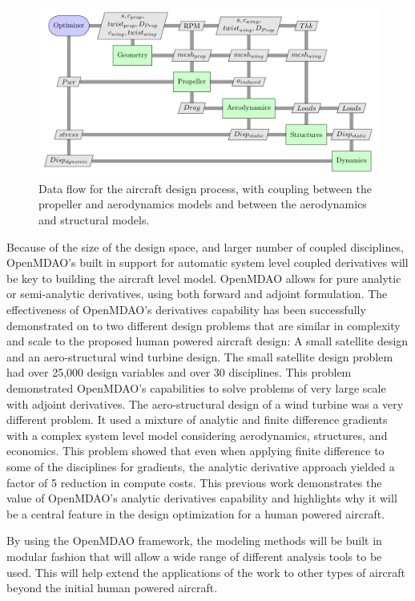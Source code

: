 \documentclass[]{aiaa-tc}
\begin{document}
    \begin{figure} \centering
        \includegraphics[width=.75\textwidth]{xdsm/overall}
        \caption{Data flow for the aircraft design process, with coupling between the propeller and aerodynamics models 
        and between the aerodynamics and structural models. }
        \label{fig:n2}
    \end{figure}

    Because of the size of the design space, and larger number of coupled disciplines, OpenMDAO's built in support for 
    automatic system level coupled derivatives will be key to building the aircraft level model. OpenMDAO allows for 
    pure analytic or semi-analytic derivatives, using both forward and adjoint formulation. The effectiveness of OpenMDAO's 
    derivatives capability has been successfully demonstrated on to two different design problems that are similar in complexity 
    and scale to the proposed human powered aircraft design: A small satellite design and an aero-structural 
    wind turbine design\cite{gray2014derivatives}. The small satellite design problem had over 25,000 design variables 
    and over 30 disciplines. This problem demonstrated OpenMDAO's capabilities to solve problems of very large scale with adjoint 
    derivatives. The aero-structural design of a wind turbine was a very different problem. It used a mixture of analytic and 
    finite difference gradients with a complex system level model considering aerodynamics, structures, and economics. 
    This problem showed that even when applying finite difference to some of the disciplines for gradients, the analytic 
    derivative approach yielded a factor of 5 reduction in compute costs. This previous work demonstrates the 
    value of OpenMDAO's analytic derivatives capability and highlights why it will be a central feature in the design 
    optimization for a human powered aircraft. 

    By using the OpenMDAO framework, the modeling methods will be built in modular fashion that will allow a wide range of
    different analysis tools to be used. This will help extend the applications of the work to other types of aircraft beyond the 
    initial human powered aircraft. 
\end{document}
